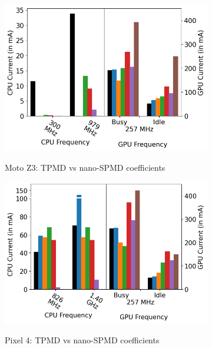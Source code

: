 \begin{figure}[tp]
\begin{subfigure}[b]{0.32\textwidth}
         \includegraphics[width=\textwidth]{figures/003_MotoZ3_1_nano_equations.png}
         \label{fig:nano_equations_z3}
         \vspace{-0.25in}
         \caption{Moto Z3: TPMD vs nano-SPMD coefficients}
     \end{subfigure}
    \begin{subfigure}[b]{0.32\textwidth}
         \centering
         \includegraphics[width=\textwidth]{figures/004_Pixel4_1_nano_equations.png}
         \label{fig:nano_equations_p4}
         \vspace{-0.25in}
         \caption{Pixel 4: TPMD vs nano-SPMD coefficients}
     \end{subfigure}
     \hfill
     \vspace{+0.1in}
     \centering
     \begin{subfigure}[b]{0.31\textwidth}

\end{subfigure}
\end{figure}
